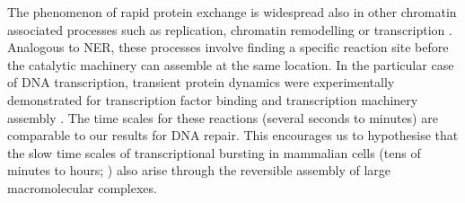 The phenomenon of rapid protein exchange is widespread also in other chromatin associated processes such as replication, chromatin remodelling or transcription \cite{McNairn2005,Erdel2011,Sonneville2012,Stasevich2011}. Analogous to NER, these processes involve finding a specific reaction site before the catalytic machinery can assemble at the same location. In the particular case of DNA transcription, transient protein dynamics were experimentally demonstrated for transcription factor binding and transcription machinery assembly \cite{Hager2009}. The time scales for these reactions (several seconds to minutes) are comparable to our results for DNA repair. This encourages us to hypothesise that the slow time scales of transcriptional bursting in mammalian cells (tens of minutes to hours; \cite{Harper2011,Suter2011}) also arise through the reversible assembly of large macromolecular complexes.   



